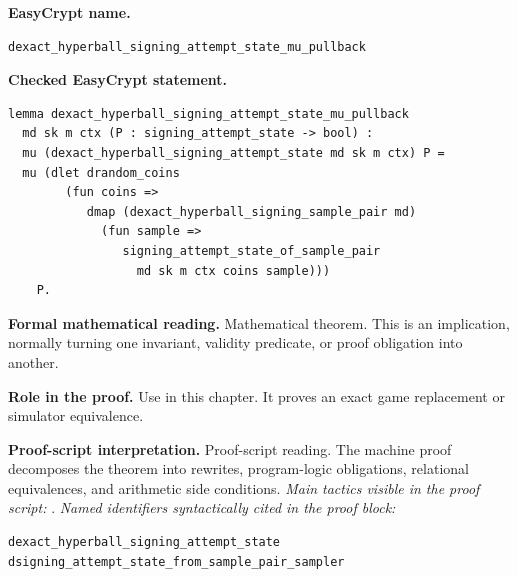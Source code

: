 \begin{formaltheorem}
\noindent\textbf{EasyCrypt name.}
\begin{lstlisting}[language=EasyCrypt,basicstyle=\ttfamily\scriptsize]
dexact_hyperball_signing_attempt_state_mu_pullback
\end{lstlisting}
\noindent\textbf{Checked EasyCrypt statement.}
\begin{lstlisting}[language=EasyCrypt,basicstyle=\ttfamily\scriptsize]
lemma dexact_hyperball_signing_attempt_state_mu_pullback
  md sk m ctx (P : signing_attempt_state -> bool) :
  mu (dexact_hyperball_signing_attempt_state md sk m ctx) P =
  mu (dlet drandom_coins
        (fun coins =>
           dmap (dexact_hyperball_signing_sample_pair md)
             (fun sample =>
                signing_attempt_state_of_sample_pair
                  md sk m ctx coins sample)))
    P.
\end{lstlisting}
\noindent\textbf{Formal mathematical reading.}
Mathematical theorem. This is an implication, normally turning one invariant, validity predicate, or proof obligation into another.

\noindent\textbf{Role in the proof.}
Use in this chapter. It proves an exact game replacement or simulator equivalence.

\noindent\textbf{Proof-script interpretation.}
Proof-script reading. The machine proof decomposes the theorem into rewrites, program-logic obligations, relational equivalences, and arithmetic side conditions.
\emph{Main tactics visible in the proof script:} .
\emph{Named identifiers syntactically cited in the proof block:}
\begin{lstlisting}[language=EasyCrypt,basicstyle=\ttfamily\scriptsize]
dexact_hyperball_signing_attempt_state
dsigning_attempt_state_from_sample_pair_sampler
\end{lstlisting}

\end{formaltheorem}

